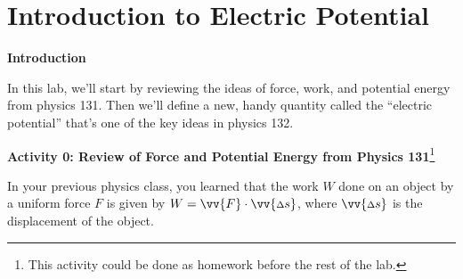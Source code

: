 \section{Introduction to Electric Potential}
\label{potential_intro}

\makelabheader %

\bigskip

\textbf{Introduction} 

In this lab, we'll start by reviewing the ideas of force, work, and potential energy from physics 131.  Then we'll define a new, handy quantity called the ``electric potential'' that's one of the key ideas in physics 132.

\bigskip

\textbf{Activity 0: Review of Force and Potential Energy from Physics 131}\footnote{This activity could be done as homework before the rest of the lab.}

In your previous physics class, you learned that the work $W$ done on an object by a uniform force $F$ is given by $W=\vv{F} \cdot \vv{{\scriptstyle \Delta} s}$, where $\vv{{\scriptstyle \Delta} s}$ is the displacement of the object.

